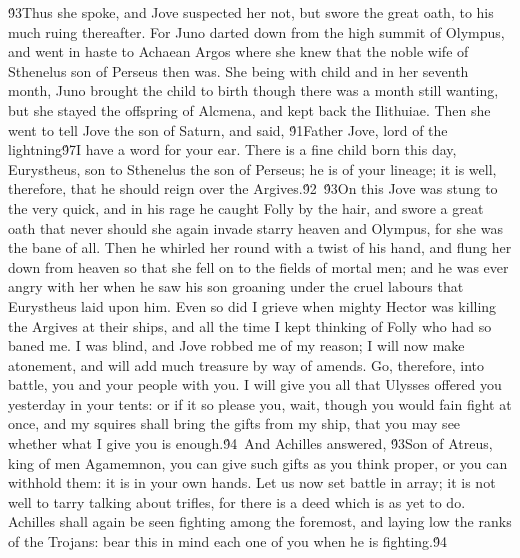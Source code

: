 {\'93Thus she spoke, and Jove suspected her not, but swore the great oath, to his much ruing thereafter. For Juno darted down from the high summit of Olympus, and went in haste to Achaean Argos where she knew that the noble wife of Sthenelus son of Perseus then was. She being with child and in her seventh month, Juno brought the child to birth though there was a month still wanting, but she stayed the offspring of Alcmena, and kept back the Ilithuiae. Then she went to tell Jove the son of Saturn, and said, \'91Father Jove, lord of the lightning\'97I have a word for your ear. There is a fine child born this day, Eurystheus, son to Sthenelus the son of Perseus; he is of your lineage; it is well, therefore, that he should reign over the Argives.\'92\
\'93On this Jove was stung to the very quick, and in his rage he caught Folly by the hair, and swore a great oath that never should she again invade starry heaven and Olympus, for she was the bane of all. Then he whirled her round with a twist of his hand, and flung her down from heaven so that she fell on to the fields of mortal men; and he was ever angry with her when he saw his son groaning under the cruel labours that Eurystheus laid upon him. Even so did I grieve when mighty Hector was killing the Argives at their ships, and all the time I kept thinking of Folly who had so baned me. I was blind, and Jove robbed me of my reason; I will now make atonement, and will add much treasure by way of amends. Go, therefore, into battle, you and your people with you. I will give you all that Ulysses offered you yesterday in your tents: or if it so please you, wait, though you would fain fight at once, and my squires shall bring the gifts from my ship, that you may see whether what I give you is enough.\'94\
And Achilles answered, \'93Son of Atreus, king of men Agamemnon, you can give such gifts as you think proper, or you can withhold them: it is in your own hands. Let us now set battle in array; it is not well to tarry talking about trifles, for there is a deed which is as yet to do. Achilles shall again be seen fighting among the foremost, and laying low the ranks of the Trojans: bear this in mind each one of you when he is fighting.\'94\
}
